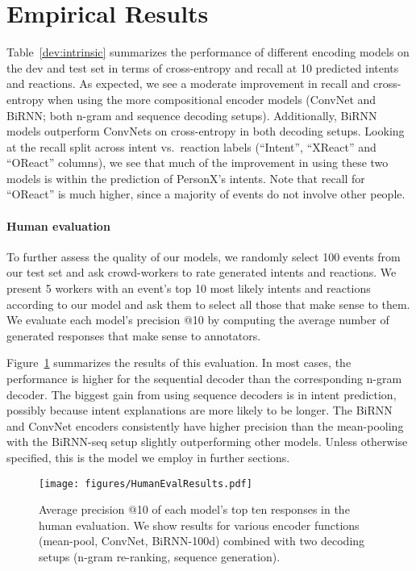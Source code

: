 \documentclass[11pt,a4paper]{article}
\begin{document}
\section{Empirical Results}



Table~\ref{dev:intrinsic} summarizes the performance of different encoding models on the dev and test set in terms of cross-entropy
and recall at 10 predicted intents and reactions.
As expected, we see a moderate improvement in recall and cross-entropy when using the more compositional encoder models (ConvNet and BiRNN; both n-gram and sequence decoding setups). 
Additionally, BiRNN models outperform ConvNets on cross-entropy in both decoding setups.
Looking at the recall split across intent vs.~reaction labels (``Intent'', ``XReact'' and ``OReact'' columns), we see that much of the improvement in using these two models is within the prediction of PersonX's intents.
Note that recall for ``OReact'' is much higher, since a majority of events do not involve other people.


\paragraph{Human evaluation}To further assess the quality of our models, we randomly select 100 events from our test set and ask crowd-workers to rate generated intents and reactions.
We present 5 workers with an event's top 10 most likely intents and reactions according to our model and ask them to select all those that make sense to them.
We evaluate each model's precision @10 by computing the average number of generated responses that make sense to annotators.

Figure~\ref{fig:humaneval} summarizes the results of this evaluation. In most cases, the performance is higher for the sequential decoder than the corresponding n-gram decoder.  The biggest gain from using sequence decoders is in intent prediction, possibly because intent explanations are more likely to be longer. The BiRNN and ConvNet encoders consistently have higher precision than the mean-pooling with the BiRNN-seq setup slightly outperforming other models.
Unless otherwise specified, this is the model we employ in further sections.


\begin{figure}[th]
\centering
\texttt{[image: figures/HumanEvalResults.pdf]}
\caption{Average precision @10 of each model's top ten responses in the human evaluation. We show results for various encoder functions (mean-pool, ConvNet, BiRNN-100d) combined with two decoding setups (n-gram re-ranking, sequence generation).}
\label{fig:humaneval}
\end{figure}
\end{document}

